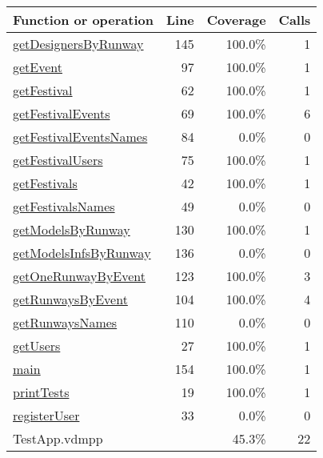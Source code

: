 \begin{longtable}{|l|r|r|r|}
\hline
Function or operation & Line & Coverage & Calls \\
\hline
\hline
\hyperref[getDesignersByRunway:145]{getDesignersByRunway} & 145&100.0\% & 1 \\
\hline
\hyperref[getEvent:97]{getEvent} & 97&100.0\% & 1 \\
\hline
\hyperref[getFestival:62]{getFestival} & 62&100.0\% & 1 \\
\hline
\hyperref[getFestivalEvents:69]{getFestivalEvents} & 69&100.0\% & 6 \\
\hline
\hyperref[getFestivalEventsNames:84]{getFestivalEventsNames} & 84&0.0\% & 0 \\
\hline
\hyperref[getFestivalUsers:75]{getFestivalUsers} & 75&100.0\% & 1 \\
\hline
\hyperref[getFestivals:42]{getFestivals} & 42&100.0\% & 1 \\
\hline
\hyperref[getFestivalsNames:49]{getFestivalsNames} & 49&0.0\% & 0 \\
\hline
\hyperref[getModelsByRunway:130]{getModelsByRunway} & 130&100.0\% & 1 \\
\hline
\hyperref[getModelsInfsByRunway:136]{getModelsInfsByRunway} & 136&0.0\% & 0 \\
\hline
\hyperref[getOneRunwayByEvent:123]{getOneRunwayByEvent} & 123&100.0\% & 3 \\
\hline
\hyperref[getRunwaysByEvent:104]{getRunwaysByEvent} & 104&100.0\% & 4 \\
\hline
\hyperref[getRunwaysNames:110]{getRunwaysNames} & 110&0.0\% & 0 \\
\hline
\hyperref[getUsers:27]{getUsers} & 27&100.0\% & 1 \\
\hline
\hyperref[main:154]{main} & 154&100.0\% & 1 \\
\hline
\hyperref[printTests:19]{printTests} & 19&100.0\% & 1 \\
\hline
\hyperref[registerUser:33]{registerUser} & 33&0.0\% & 0 \\
\hline
\hline
TestApp.vdmpp & & 45.3\% & 22 \\
\hline
\end{longtable}

